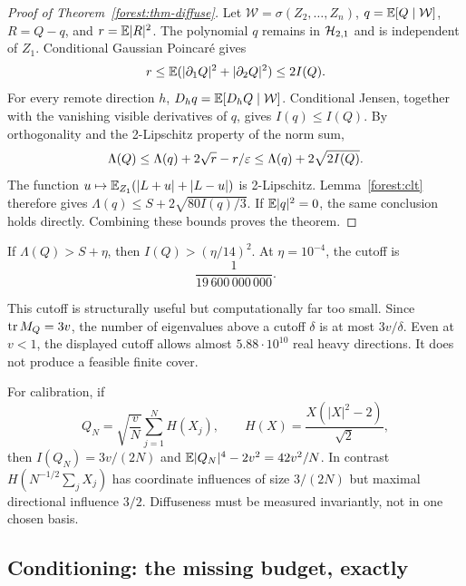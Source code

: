 \begin{proof}[Proof of Theorem~\ref{forest:thm-diffuse}]
Let \(\mathcal W=\sigma(Z_2,\ldots,Z_n)\),
\(q=\mathbb E[Q\mid\mathcal W]\), \(R=Q-q\), and \(r=\mathbb E|R|^2\).
The polynomial \(q\) remains in \(\mathcal H_{2,1}\) and is independent of
\(Z_1\). Conditional Gaussian Poincar\'e gives
\[
r\le\mathbb E(|\partial_1Q|^2+|\partial_2Q|^2)\le2I(Q).
\]
For every remote direction \(h\),
\(D_hq=\mathbb E[D_hQ\mid\mathcal W]\). Conditional Jensen, together with
the vanishing visible derivatives of \(q\), gives \(I(q)\le I(Q)\).
By orthogonality and the 2-Lipschitz property of the norm sum,
\[
\Lambda(Q)\le\Lambda(q)+2\sqrt r-r/\varepsilon
             \le\Lambda(q)+2\sqrt{2I(Q)}.
\]
The function
\(u\mapsto\mathbb E_{Z_1}(|L+u|+|L-u|)\) is 2-Lipschitz.
Lemma~\ref{forest:clt} therefore gives
\(\Lambda(q)\le S+2\sqrt{80I(q)/3}\).
If \(\mathbb E|q|^2=0\), the same conclusion holds directly. Combining
these bounds proves the theorem.
\end{proof}

\begin{corollary}
If \(\Lambda(Q)>S+\eta\), then \(I(Q)>(\eta/14)^2\).
At \(\eta=10^{-4}\), the cutoff is
\[
\frac{1}{19\,600\,000\,000}.
\]
\end{corollary}

This cutoff is structurally useful but computationally far too small.
Since \(\operatorname{tr} M_Q=3v\), the number of eigenvalues above a cutoff
\(\delta\) is at most \(3v/\delta\). Even at \(v<1\), the displayed
cutoff allows almost \(5.88\cdot10^{10}\) real heavy directions.
It does not produce a feasible finite cover.

For calibration, if
\[
Q_N=\sqrt{\frac vN}\sum_{j=1}^N H(X_j),\qquad
H(X)=\frac{X(|X|^2-2)}{\sqrt2},
\]
then \(I(Q_N)=3v/(2N)\) and
\(\mathbb E|Q_N|^4-2v^2=42v^2/N\).
In contrast \(H(N^{-1/2}\sum_jX_j)\) has coordinate influences
of size \(3/(2N)\) but maximal directional influence \(3/2\).
Diffuseness must be measured invariantly, not in one chosen basis.

\subsection{Conditioning: the missing budget, exactly}
\label{forest:conditioning}

